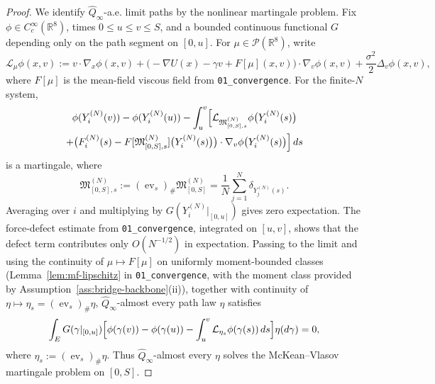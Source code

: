 \documentclass[11pt]{article}
\theoremstyle{definition}
\theoremstyle{remark}
\newcommand{\R}{\mathbb R}
\newcommand{\mcP}{\mathcal P}
\begin{document}
\begin{proof}
We identify \(\widehat Q_\infty\)-a.e. limit paths by the nonlinear martingale
problem.
Fix \(\phi\in C_c^\infty(\R^8)\), times \(0\le u\le v\le S\), and a bounded
continuous functional \(G\) depending only on the path segment on \([0,u]\).
For \(\mu\in\mcP(\R^8)\), write
\[
\mathcal L_\mu \phi(x,v)
:=
v\cdot\nabla_x\phi(x,v)
+\bigl(-\nabla U(x)-\gamma v+F[\mu](x,v)\bigr)\cdot\nabla_v\phi(x,v)
+\frac{\sigma^2}{2}\Delta_v\phi(x,v),
\]
where \(F[\mu]\) is the mean-field viscous field from
\texttt{01\_convergence}.
For the finite-\(N\) system,
\begin{multline*}
\phi(Y_i^{(N)}(v))-\phi(Y_i^{(N)}(u))
-\int_u^v
\Bigl[
\mathcal L_{\mathfrak M_{[0,S],s}^{(N)}}\phi\bigl(Y_i^{(N)}(s)\bigr)\\
+\bigl(
F_i^{(N)}(s)-F[\mathfrak M_{[0,S],s}^{(N)}]\bigl(Y_i^{(N)}(s)\bigr)
\bigr)
\cdot\nabla_v\phi\bigl(Y_i^{(N)}(s)\bigr)
\Bigr]\,ds
\end{multline*}
is a martingale, where
\[
\mathfrak M_{[0,S],s}^{(N)}
:=
(\operatorname{ev}_s)_\#\mathfrak M_{[0,S]}^{(N)}
=
\frac1N\sum_{j=1}^N \delta_{Y_j^{(N)}(s)}.
\]
Averaging over \(i\) and multiplying by \(G(Y_i^{(N)}|_{[0,u]})\) gives zero
expectation.
The force-defect estimate from \texttt{01\_convergence}, integrated on
\([u,v]\), shows that the defect term contributes only \(O(N^{-1/2})\) in
expectation.
Passing to the limit and using the continuity of \(\mu\mapsto F[\mu]\) on
uniformly moment-bounded classes (Lemma~\ref{lem:mf-lipschitz} in
\texttt{01\_convergence}, with the moment class provided by
Assumption~\ref{ass:bridge-backbone}(ii)), together with continuity of
\(\eta\mapsto\eta_s=(\operatorname{ev}_s)_\#\eta\), \(\widehat Q_\infty\)-almost
every path law \(\eta\) satisfies
\[
\int_E
G(\gamma|_{[0,u]})
\Bigl[
\phi(\gamma(v))-\phi(\gamma(u))
-\int_u^v \mathcal L_{\eta_s}\phi(\gamma(s))\,ds
\Bigr]
\eta(d\gamma)
=
0,
\]
where \(\eta_s:=(\operatorname{ev}_s)_\#\eta\).
Thus \(\widehat Q_\infty\)-almost every \(\eta\) solves the McKean--Vlasov
martingale problem on \([0,S]\).


\end{proof}
\end{document}
